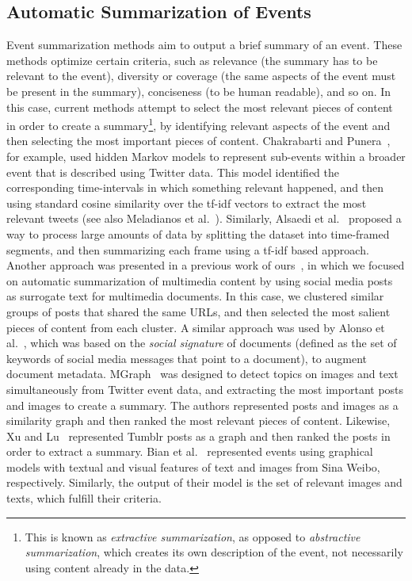 \subsection{Automatic Summarization of Events} 
%
Event summarization methods aim to output a brief summary of an event.
%
These methods optimize certain criteria, such as relevance (the summary has to
be relevant to the event), diversity or coverage (the same aspects of the event
must be present in the summary), conciseness (to be human readable), and so on.
%
In this case, current methods attempt to select the most relevant pieces of
content in order to create a summary\footnote{This is known as {\em extractive
summarization}, as opposed to {\em abstractive summarization}, which creates its
own description of the event, not necessarily using content already in the
data.}, by identifying relevant aspects of the event and then selecting the most
important pieces of content.
%
Chakrabarti and Punera~\cite{chakrabarti2011event}, for example, used hidden
Markov models to represent sub-events within a broader event that is described
using Twitter data. 
%
This model identified the corresponding time-intervals in which something
relevant happened, and then using standard cosine similarity over the tf-idf
vectors to extract the most relevant tweets (see also Meladianos et
al.~\cite{meladianos2018optimization}).
%
Similarly, Alsaedi et al.~\cite{alsaedi2016temporal} proposed a way to process
large amounts of data by splitting the dataset into time-framed segments, and
then summarizing each frame using a tf-idf based approach.
%
Another approach was presented in a previous work of
ours~\cite{quezada2013understanding}, in which we focused on automatic
summarization of multimedia content by using social media posts as surrogate
text for multimedia documents.
%
In this case, we clustered similar groups of posts that shared the same URLs,
and then selected the most salient pieces of content from each cluster.
%
A similar approach was used by Alonso et
al.~\cite{Alonso:2015:WCW:2740908.2745397}, which was based on the \emph{social
signature} of documents (defined as the set of keywords of social media messages
that point to a document), to augment document metadata.
%
MGraph~\cite{schinas2016mgraph} was designed to detect topics on images and text
simultaneously from Twitter event data, and extracting the most important posts
and images to create a summary.
%
The authors represented posts and images as a similarity graph and then ranked
the most relevant pieces of content.
%
Likewise, Xu and Lu~\cite{Xu:2015:SBP:2678025.2701385} represented Tumblr posts
as a graph and then ranked the posts in order to extract a summary.
%
Bian et al.~\cite{bian2014multimedia} represented events using graphical models
with textual and visual features of text and images from Sina Weibo,
respectively.
%
Similarly, the output of their model is the set of relevant images and texts,
which fulfill their criteria.

